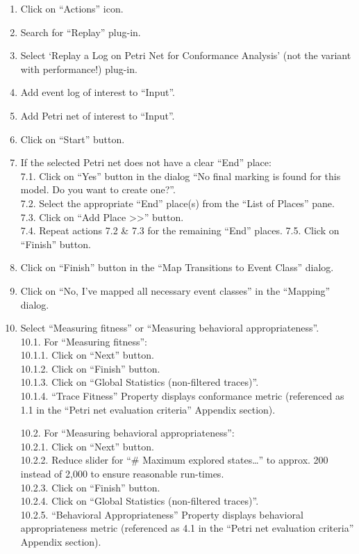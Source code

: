 \documentclass[]{article}
\begin{document}
\begin{enumerate}
\def\labelenumi{\arabic{enumi}.}
\item
  Click on ``Actions'' icon.
\item
  Search for ``Replay'' plug-in.
\item
  Select `Replay a Log on Petri Net for Conformance Analysis' (not the
  variant with performance!) plug-in.
\item
  Add event log of interest to ``Input''.
\item
  Add Petri net of interest to ``Input''.
\item
  Click on ``Start'' button.
\item
  If the selected Petri net does not have a clear ``End'' place:\\7.1.
  Click on ``Yes'' button in the dialog ``No final marking is found for
  this model. Do you want to create one?''.\\7.2. Select the appropriate
  ``End'' place(s) from the ``List of Places'' pane.\\7.3. Click on
  ``Add Place \textgreater{}\textgreater{}'' button.\\7.4. Repeat
  actions 7.2 \& 7.3 for the remaining ``End'' places. 7.5. Click on
  ``Finish'' button.
\item
  Click on ``Finish'' button in the ``Map Transitions to Event Class''
  dialog.
\item
  Click on ``No, I've mapped all necessary event classes'' in the
  ``Mapping'' dialog.
\item
  Select ``Measuring fitness'' or ``Measuring behavioral
  appropriateness''.\\10.1. For ``Measuring fitness'':\\ 10.1.1. Click
  on ``Next'' button.\\ 10.1.2. Click on ``Finish'' button.\\ 10.1.3.
  Click on ``Global Statistics (non-filtered traces)''.\\ 10.1.4.
  ``Trace Fitness'' Property displays conformance metric (referenced as
  1.1 in the ``Petri net evaluation criteria'' Appendix section).

  10.2. For ``Measuring behavioral appropriateness'':\\ 10.2.1. Click on
  ``Next'' button.\\ 10.2.2. Reduce slider for ``\# Maximum explored
  states\ldots{}'' to approx. 200 instead of 2,000 to ensure reasonable
  run-times.\\ 10.2.3. Click on ``Finish'' button.\\ 10.2.4. Click on
  ``Global Statistics (non-filtered traces)''.\\ 10.2.5. ``Behavioral
  Appropriateness'' Property displays behavioral appropriateness metric
  (referenced as 4.1 in the ``Petri net evaluation criteria'' Appendix
  section).
\end{enumerate}
\end{document}
